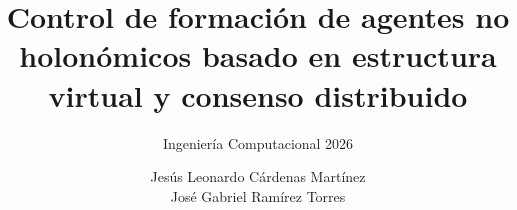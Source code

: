 \title{Control de formación de agentes no holonómicos basado en estructura virtual y consenso distribuido}
\subtitle{Ingeniería Computacional 2026}
\author{Jesús Leonardo Cárdenas Martínez\\ José Gabriel Ramírez Torres}


\maketitle